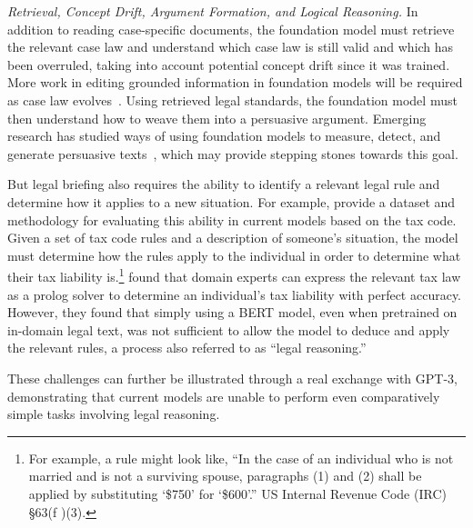 \textit{Retrieval, Concept Drift, Argument Formation, and Logical Reasoning.} In addition to reading case-specific documents, the foundation model must retrieve the relevant case law and understand which case law is still valid and which has been overruled, taking into account potential concept drift since it was trained. More work in editing grounded information in foundation models will be required as case law evolves~\citep{de2021editing}. Using retrieved legal standards, the foundation model must then understand how to weave them into a persuasive argument. Emerging research has studied ways of using foundation models to measure, detect, and generate persuasive texts~\citep{duerr2021persuasive, li-etal-2020-exploring,longpre-etal-2019-persuasion}, which may provide stepping stones towards this goal.

But legal briefing also requires the ability to identify a relevant legal rule and determine how it applies to a new situation. For example, \citet{holzenberger2020dataset} provide a dataset and methodology for evaluating this ability in current models based on the tax code. Given a set of tax code rules and a description of someone's situation, the model must determine how the rules apply to the individual in order to determine what their tax liability is.\footnote{For example, a rule might look like, ``In the case of an individual who is not married and is not a surviving spouse, paragraphs (1) and (2) shall be applied by substituting `\$750' for `\$600'.'' US Internal Revenue Code (IRC) \S 63(f )(3).}
\citet{holzenberger2020dataset} found that domain experts can express the relevant tax law as a prolog solver to determine an individual's tax liability with perfect accuracy. However, they found that simply using a BERT model, even when pretrained on in-domain legal text, was not sufficient to allow the model to deduce and apply the relevant rules, a process also referred to as ``legal reasoning.'' 

These challenges can further be illustrated through a real exchange with GPT-3, demonstrating that current models are unable to perform even comparatively simple tasks involving legal reasoning.


